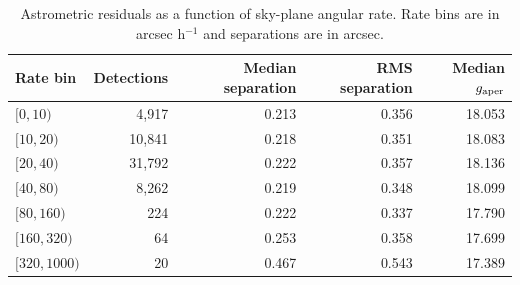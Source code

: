 \begin{table}
\centering
\caption{Astrometric residuals as a function of sky-plane angular rate. Rate bins are in arcsec h$^{-1}$ and separations are in arcsec.}
\label{tab:rate_astrometry}
\footnotesize
\setlength{\tabcolsep}{6pt}
\renewcommand{\arraystretch}{1.12}
\begin{tabular}{lrrrr}
\toprule
Rate bin & Detections & Median separation & RMS separation & Median $g_{\rm aper}$ \\
\midrule
$[0,10)$ & 4,917 & 0.213 & 0.356 & 18.053 \\
$[10,20)$ & 10,841 & 0.218 & 0.351 & 18.083 \\
$[20,40)$ & 31,792 & 0.222 & 0.357 & 18.136 \\
$[40,80)$ & 8,262 & 0.219 & 0.348 & 18.099 \\
$[80,160)$ & 224 & 0.222 & 0.337 & 17.790 \\
$[160,320)$ & 64 & 0.253 & 0.358 & 17.699 \\
$[320,1000)$ & 20 & 0.467 & 0.543 & 17.389 \\
\bottomrule
\end{tabular}
\end{table}
